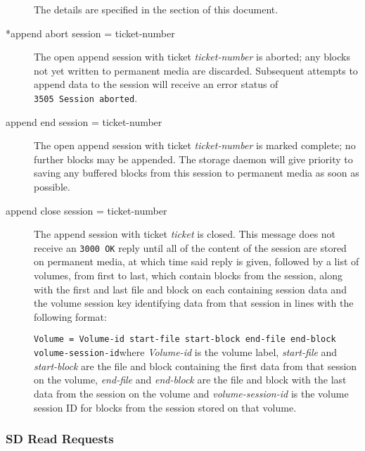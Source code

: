 \begin{description}
The details are specified in the 
  section of this
document.  

\item [*append abort session = \lt{}ticket-number\gt{}  ]
   The open append session with ticket {\it ticket-number} is aborted; any blocks
not yet written to permanent media are discarded. Subsequent attempts to 
append data to the session will receive an error status of  {\tt 3505\
Session\ aborted}.  

\item [append end session = \lt{}ticket-number\gt{}  ]
   The open append session with ticket {\it ticket-number} is marked complete; no
further blocks may be appended. The storage daemon will give priority to
saving  any buffered blocks from this session to permanent media as soon as
possible.  

\item [append close session = \lt{}ticket-number\gt{}  ]
   The append session with ticket {\it ticket} is closed. This message  does not
receive an {\tt 3000\ OK} reply until all of the content of the  session are
stored on permanent media, at which time said reply is given,  followed by a
list of volumes, from first to last, which contain blocks from  the session,
along with the first and last file and block on each containing  session data
and the volume session key identifying data from that session in  lines with
the following format:  

{\tt {\tt Volume = }\lt{}Volume-id\gt{} \lt{}start-file\gt{}
\lt{}start-block\gt{}  \lt{}end-file\gt{} \lt{}end-block\gt{}
\lt{}volume-session-id\gt{}}where {\it Volume-id} is the volume label,  {\it
start-file} and {\it start-block} are the file and block containing the  first
data from that session on the volume, {\it end-file} and  {\it end-block} are
the file and block with the last data from the session on  the volume and {\it
volume-session-id} is the volume session ID for blocks from the  session
stored on that volume. 
\end{description}

\subsubsection*{SD Read Requests}

